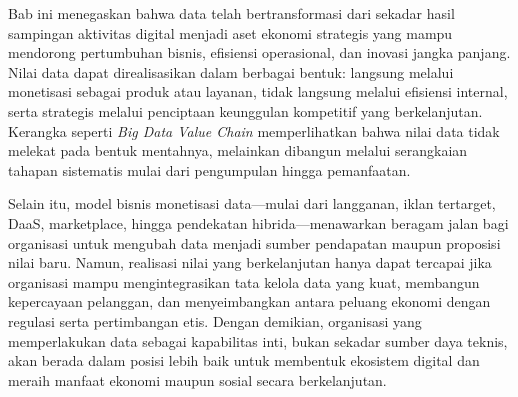 Bab ini menegaskan bahwa data telah bertransformasi dari sekadar hasil sampingan aktivitas digital menjadi aset ekonomi strategis yang mampu mendorong pertumbuhan bisnis, efisiensi operasional, dan inovasi jangka panjang. Nilai data dapat direalisasikan dalam berbagai bentuk: langsung melalui monetisasi sebagai produk atau layanan, tidak langsung melalui efisiensi internal, serta strategis melalui penciptaan keunggulan kompetitif yang berkelanjutan. Kerangka seperti \textit{Big Data Value Chain} memperlihatkan bahwa nilai data tidak melekat pada bentuk mentahnya, melainkan dibangun melalui serangkaian tahapan sistematis mulai dari pengumpulan hingga pemanfaatan.

Selain itu, model bisnis monetisasi data—mulai dari langganan, iklan tertarget, DaaS, marketplace, hingga pendekatan hibrida—menawarkan beragam jalan bagi organisasi untuk mengubah data menjadi sumber pendapatan maupun proposisi nilai baru. Namun, realisasi nilai yang berkelanjutan hanya dapat tercapai jika organisasi mampu mengintegrasikan tata kelola data yang kuat, membangun kepercayaan pelanggan, dan menyeimbangkan antara peluang ekonomi dengan regulasi serta pertimbangan etis. Dengan demikian, organisasi yang memperlakukan data sebagai kapabilitas inti, bukan sekadar sumber daya teknis, akan berada dalam posisi lebih baik untuk membentuk ekosistem digital dan meraih manfaat ekonomi maupun sosial secara berkelanjutan.


